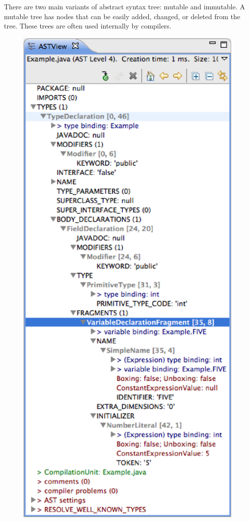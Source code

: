 \documentclass[prodmode]{acmlarge}
\begin{document}
There are two main variants of abstract syntax tree:
mutable and immutable. A mutable tree has nodes that can be easily added, 
changed, or deleted from the tree. 
These trees are often used internally by compilers.
\begin{figure} %
\includegraphics[scale=0.62]{jdt-ast.eps}

\end{figure}
\end{document}
